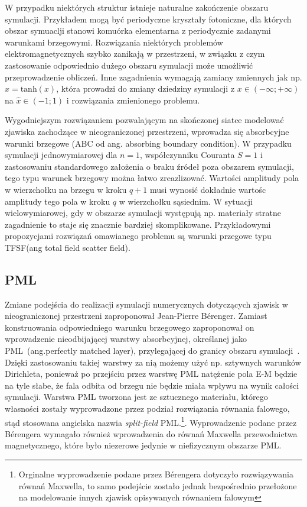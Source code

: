 W przypadku niektórych struktur istnieje naturalne zakończenie obszaru symulacji. Przykładem mogą być periodyczne kryształy fotoniczne, dla których obszar symuaclji stanowi komuórka elementarna z periodycznie zadanymi warunkami brzegowymi. Rozwiązania niektórych problemów elektromagnetycznych szybko zanikają w przestrzeni, w związku z czym zastosowanie odpowiednio dużego obszaru symulacji może umożliwić przeprowadzenie obliczeń. Inne zagadnienia wymagają zamiany zmiennych  jak np. $\hat{x}=\textrm{tanh}(x)$, która prowadzi do zmiany dziedziny symulacji z $x\in(- \infty; + \infty)$ na $\hat{x}\in(-1;1)$ i rozwiązania zmienionego problemu. 

Wygodniejszym rozwiązaniem pozwalającym na skończonej siatce modelować zjawiska zachodzące w nieograniczonej przestrzeni, wprowadza się absorbcyjne warunki brzegowe (ABC od ang. absorbing boundary condition). W przypadku symulacji jednowymiarowej dla $n=1$, współczynniku Couranta $S=1$ i zastosowaniu standardowego założenia o braku źródeł poza obszarem symulacji, tego typu warunek brzegowy można łatwo zreazlizować. Wartości amplitudy pola w wierzchołku na brzegu w kroku $q+1$ musi wynosić dokładnie wartośc amplitudy tego pola w kroku $q$ w wierzchołku sąsiednim. W sytuacji wielowymiarowej, gdy w obszarze symulacji występują np. materiały stratne zagadnienie to staje się znacznie bardziej skomplikowane. Przykładowymi propozycjami rozwiązań omawianego problemu są warunki przegowe typu TFSF(ang total field scatter field).

\subsection{PML}
\label{art:pml}
Zmiane podejścia do realizacji symulacji numerycznych dotyczących zjawisk w nieograniczonej przestrzeni zaproponował Jean-Pierre B\'{e}renger. Zamiast konstruowania odpowiedniego warunku brzegowego zaproponował on wprowadzenie nieodbijającej warstwy absorbcyjnej, określanej jako PML~(ang.perfectly matched layer), przylegającej do granicy obszaru symulacji~\cite{1994JCoPh.114..185B}. Dzięki zastosowaniu takiej warstwy za nią możemy użyć np. sztywnych warunków Dirichleta, ponieważ po przejściu przez warstwę PML natężenie pola E-M będzie na tyle słabe, że fala odbita od brzegu nie będzie miała wpływu na wynik całości symulacji. Warstwa PML tworzona jest ze sztucznego materiału, którego własności zostały wyprowadzone przez podział rozwiązania równania falowego,  stąd stosowana angielska nazwia {\it split-field} PML.\footnote{Orginalne wyprowadzenie podane przez B\'{e}rengera dotyczyło rozwiązywania równań Maxwella, to samo podejście zostało jednak bezpośrednio przełożone na modelowanie innych zjawisk opisywanych równaniem falowym}.  Wyprowadzenie podane przez B\'{e}rengera  wymagało również wprowadzenia do równań Maxwella przewodnictwa magnetycznego, które było niezerowe jedynie w niefizycznym obszarze PML.


